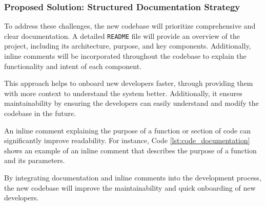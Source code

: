 \subsubsection{Proposed Solution: Structured Documentation Strategy}
To address these challenges, the new codebase will prioritize comprehensive and clear documentation. A detailed \texttt{README} file will provide an overview of the project, including its architecture, purpose, and key components. Additionally, inline comments will be incorporated throughout the codebase to explain the functionality and intent of each component.

This approach helps to onboard new developers faster, through providing them with more context to understand the system better. Additionally, it ensures maintainability by ensuring the developers can easily understand and modify the codebase in the future.

An inline comment explaining the purpose of a function or section of code can significantly improve readability. For instance, Code \ref{lst:code_documentation} shows an example of an inline comment that describes the purpose of a function and its parameters.

By integrating documentation and inline comments into the development process, the new codebase will improve the maintainability and quick onboarding of new developers.
